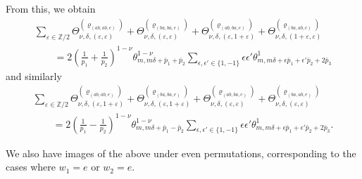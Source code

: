 \documentclass[10pt,a4paper]{amsart}
\newcommand{\ZZ}{\mathbb{Z}}
\def\bos{\varrho}
\theoremstyle{definition}
\numberwithin{equation}{section}
\begin{document}
From this, we obtain
\begin{gather*}
 \sum_{\varepsilon\in\ZZ/2}\Theta_{\nu,\delta,(\varepsilon,\varepsilon)}^{(\bos_{(ab,ab,e)})} +\Theta_{\nu,\delta,(\varepsilon,\varepsilon)}^{(\bos_{(ba,ba,e)})}
+ \Theta_{\nu,\delta,(\varepsilon,1+\varepsilon)}^{(\bos_{(ab,ba,e)})} +\Theta_{\nu,\delta,
(1+\varepsilon,\varepsilon)}^{(\bos_{(ba,ab,e)})} \\
 \qquad = 2 \left(\frac{1}{p_1}+\frac{1}{p_2}\right)^{1-\nu}
 \theta^{1-\nu}_{m,m\delta+\bar p_1+ \bar p_2} \sum_{\epsilon,\epsilon'\in \{1,-1\}} \epsilon \epsilon' \theta^1_{m,m\delta+ \epsilon\bar p_1+ \epsilon'\bar p_2+ 2\bar p_3}
\end{gather*}
and similarly
\begin{gather*}
\sum_{\varepsilon\in\ZZ/2}\Theta_{\nu,\delta,(\varepsilon,1+\varepsilon)}^{(\bos_{(ab,ab,e)})} +\Theta_{\nu,\delta,(\varepsilon,1+\varepsilon)}^{(\bos_{(ba,ba,e)})}
+ \Theta_{\nu,\delta,(\varepsilon,\varepsilon)}^{(\bos_{(ab,ba,e)})} +\Theta_{\nu,\delta,(\varepsilon,\varepsilon)}^{(\bos_{(ba,ab,e)})} \\
 \qquad = 2\left(\frac{1}{p_1}-\frac{1}{p_2}\right)^{1-\nu}
 \theta^{1-\nu}_{m,m\delta+\bar p_1-\bar p_2} \sum_{\epsilon,\epsilon'\in \{1,-1\}} \epsilon \epsilon' \theta^1_{m,m\delta+\epsilon \bar p_1+ \epsilon' \bar p_2+2\bar p_3} .
\end{gather*}

We also have images of the above under even permutations, corresponding to the cases where $w_1=e$ or $w_2=e$.
\end{document}
